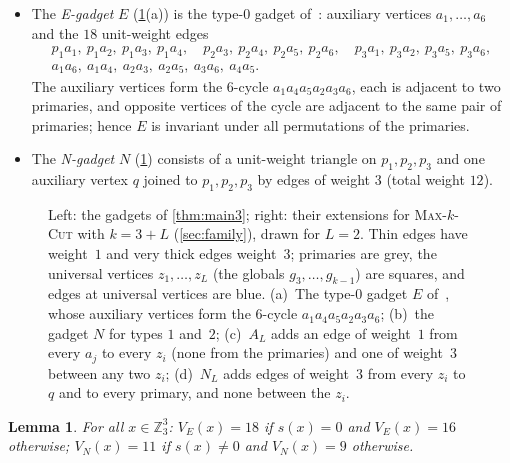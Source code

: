 \documentclass[11pt,letterpaper]{article}
\newtheorem{lemma}[theorem]{Lemma}
\theoremstyle{remark}
\newcommand{\MC}[1]{\textup{\textsc{Max-$#1$-Cut}}}
\newcommand{\Z}{\mathbb{Z}}
\begin{document}
\begin{itemize}
\item The \emph{E-gadget} $E$ (\cref{fig:gadgets}(a)) is the type-$0$ gadget of~\cite[Lemma~C.1]{NRT25}: auxiliary vertices
$a_1,\dots,a_6$ and the $18$ unit-weight edges
\[
\begin{array}{l}
p_1a_1,\ p_1a_2,\ p_1a_3,\ p_1a_4,\quad p_2a_3,\ p_2a_4,\ p_2a_5,\ p_2a_6,\quad
p_3a_1,\ p_3a_2,\ p_3a_5,\ p_3a_6,\\
a_1a_6,\ a_1a_4,\ a_2a_3,\ a_2a_5,\ a_3a_6,\ a_4a_5.
\end{array}
\]
The auxiliary vertices form the $6$-cycle $a_1a_4a_5a_2a_3a_6$, each is adjacent to two primaries, and
opposite vertices of the cycle are adjacent to the same pair of primaries; hence $E$ is invariant under all
permutations of the primaries.
\item The \emph{N-gadget} $N$ (\cref{fig:gadgets}) consists of a unit-weight triangle on $p_1,p_2,p_3$ and
one auxiliary vertex $q$ joined to $p_1,p_2,p_3$ by edges of weight $3$ (total weight $12$).
\end{itemize}

\begin{figure}[t]
\centering

\caption{Left: the gadgets of \cref{thm:main3}; right: their extensions for \MC{k} with $k=3+L$
(\cref{sec:family}), drawn for $L=2$. Thin edges have weight~$1$ and very thick edges weight~$3$; primaries
are grey, the universal vertices $z_1,\dots,z_L$ (the globals $g_3,\dots,g_{k-1}$) are squares, and edges at universal vertices are blue. (a)~The type-$0$
gadget $E$ of~\cite{NRT25}, whose auxiliary vertices form the $6$-cycle $a_1a_4a_5a_2a_3a_6$; (b)~the
gadget $N$ for types $1$ and~$2$; (c)~$A_L$ adds an edge of weight~$1$ from every $a_j$ to every $z_i$
(none from the primaries) and one of weight~$3$ between any two $z_i$; (d)~$N_L$ adds edges of weight~$3$
from every $z_i$ to $q$ and to every primary, and none between the $z_i$.}
\label{fig:gadgets}
\end{figure}

\begin{lemma}\label{lem:EN}
For all $x\in\Z_3^3$: $V_E(x)=18$ if $s(x)=0$ and $V_E(x)=16$ otherwise; $V_N(x)=11$ if $s(x)\neq 0$ and
$V_N(x)=9$ otherwise.
\end{lemma}
\end{document}
